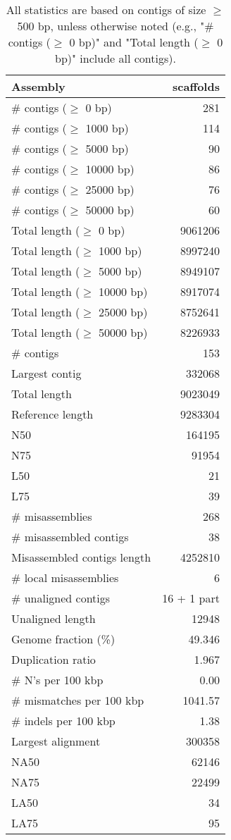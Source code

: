 \documentclass[12pt,a4paper]{article}
\begin{document}
\begin{table}[ht]
\begin{center}
\caption{All statistics are based on contigs of size $\geq$ 500 bp, unless otherwise noted (e.g., "\# contigs ($\geq$ 0 bp)" and "Total length ($\geq$ 0 bp)" include all contigs).}
\begin{tabular}{|l*{1}{|r}|}
\hline
Assembly & scaffolds \\ \hline
\# contigs ($\geq$ 0 bp) & 281 \\ \hline
\# contigs ($\geq$ 1000 bp) & 114 \\ \hline
\# contigs ($\geq$ 5000 bp) & 90 \\ \hline
\# contigs ($\geq$ 10000 bp) & 86 \\ \hline
\# contigs ($\geq$ 25000 bp) & 76 \\ \hline
\# contigs ($\geq$ 50000 bp) & 60 \\ \hline
Total length ($\geq$ 0 bp) & 9061206 \\ \hline
Total length ($\geq$ 1000 bp) & 8997240 \\ \hline
Total length ($\geq$ 5000 bp) & 8949107 \\ \hline
Total length ($\geq$ 10000 bp) & 8917074 \\ \hline
Total length ($\geq$ 25000 bp) & 8752641 \\ \hline
Total length ($\geq$ 50000 bp) & 8226933 \\ \hline
\# contigs & 153 \\ \hline
Largest contig & 332068 \\ \hline
Total length & 9023049 \\ \hline
Reference length & 9283304 \\ \hline
N50 & 164195 \\ \hline
N75 & 91954 \\ \hline
L50 & 21 \\ \hline
L75 & 39 \\ \hline
\# misassemblies & 268 \\ \hline
\# misassembled contigs & 38 \\ \hline
Misassembled contigs length & 4252810 \\ \hline
\# local misassemblies & 6 \\ \hline
\# unaligned contigs & 16 + 1 part \\ \hline
Unaligned length & 12948 \\ \hline
Genome fraction (\%) & 49.346 \\ \hline
Duplication ratio & 1.967 \\ \hline
\# N's per 100 kbp & 0.00 \\ \hline
\# mismatches per 100 kbp & 1041.57 \\ \hline
\# indels per 100 kbp & 1.38 \\ \hline
Largest alignment & 300358 \\ \hline
NA50 & 62146 \\ \hline
NA75 & 22499 \\ \hline
LA50 & 34 \\ \hline
LA75 & 95 \\ \hline
\end{tabular}
\end{center}
\end{table}
\end{document}
